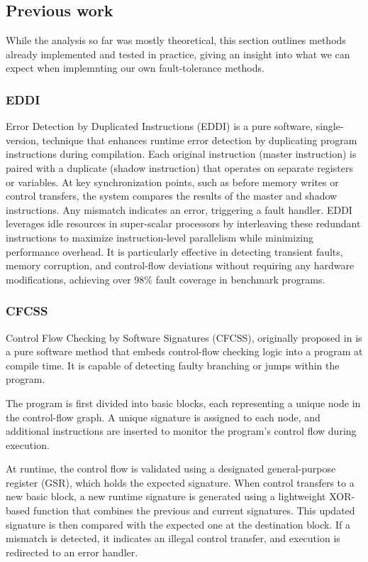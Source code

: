\subsection{Previous work}

While the analysis so far was mostly theoretical, this section outlines methods already implemented and tested in practice, giving an insight into what we can expect when implemnting our own fault-tolerance methods.

\subsubsection{EDDI}

Error Detection by Duplicated Instructions \cite{eddi} (EDDI) is a pure software, single-version, technique that enhances runtime error detection by duplicating program instructions during compilation. Each original instruction (master instruction) is paired with a duplicate (shadow instruction) that operates on separate registers or variables. At key synchronization points, such as before memory writes or control transfers, the system compares the results of the master and shadow instructions. Any mismatch indicates an error, triggering a fault handler. EDDI leverages idle resources in super-scalar processors by interleaving these redundant instructions to maximize instruction-level parallelism while minimizing performance overhead. It is particularly effective in detecting transient faults, memory corruption, and control-flow deviations without requiring any hardware modifications, achieving over 98\% fault coverage in benchmark programs.


\subsubsection{CFCSS}

Control Flow Checking by Software Signatures (CFCSS), originally proposed in \cite{994926} is a pure software method that embeds control-flow checking logic into a program at compile time. It is capable of detecting faulty branching or jumps within the program. 

The program is first divided into basic blocks, each representing a unique node in the control-flow graph. A unique signature is assigned to each node, and additional instructions are inserted to monitor the program's control flow during execution.

At runtime, the control flow is validated using a designated general-purpose register (GSR), which holds the expected signature. When control transfers to a new basic block, a new runtime signature is generated using a lightweight XOR-based function that combines the previous and current signatures. This updated signature is then compared with the expected one at the destination block. If a mismatch is detected, it indicates an illegal control transfer, and execution is redirected to an error handler.

